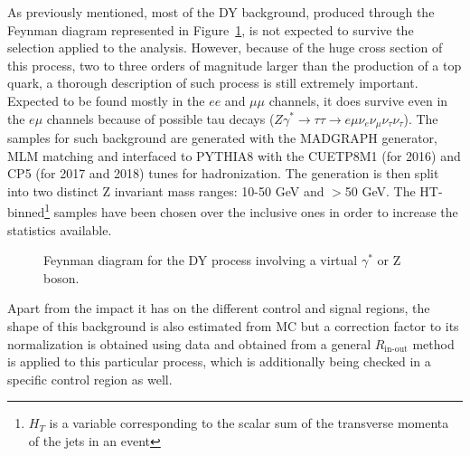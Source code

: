 \documentclass[a4paper, 10pt, openright]{report}
\begin{document}
As previously mentioned, most of the \ac{DY} background, produced through the Feynman diagram represented in Figure~\ref{fig:DY}, is not expected to survive the selection applied to the analysis. However, because of the huge cross section of this process, two to three orders of magnitude larger than the production of a top quark, a thorough description of such process is still extremely important. Expected to be found mostly in the $ee$ and $\mu \mu$ channels, it does survive even in the $e \mu$ channels because of possible tau decays ($Z \gamma^{*} \rightarrow \tau \tau \rightarrow e \mu \nu_e \nu_\mu \nu_\tau \nu_\tau$). The samples for such background are generated with the MADGRAPH generator, MLM matching and interfaced to PYTHIA8 with the CUETP8M1 (for 2016) and CP5 (for 2017 and 2018) tunes for hadronization. The generation is then split into two distinct Z invariant mass ranges: 10-50 GeV and $>$50 GeV. The HT-binned\footnote{$H_T$ is a variable corresponding to the scalar sum of the transverse momenta of the jets in an event} samples have been chosen over the inclusive ones in order to increase the statistics available.

\begin{figure}[htbp]
\centering
\begin{minipage}[b]{.34\textwidth}
\end{minipage} 
\caption{Feynman diagram for the \ac{DY} process involving a virtual $\gamma^*$ or Z boson.}
\label{fig:DY}
\end{figure}

Apart from the impact it has on the different control and signal regions, the shape of this background is also estimated from \ac{MC} but a correction factor to its normalization is obtained using data and obtained from a general $R_{\text{in-out}}$ method is applied to this particular process, which is additionally being checked in a specific control region as well.
\end{document}
